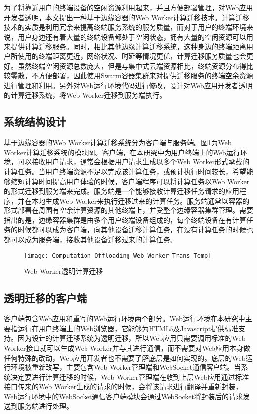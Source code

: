 为了将靠近用户的终端设备的空闲资源利用起来，并且方便部署管理，对Web应用开发者透明，本文提出一种基于边缘容器的Web Worker计算迁移技术。计算迁移技术的实质是利用冗余来提高终端服务系统的服务质量，而对于用户的终端环境来说，用户身边还有着大量的终端设备都处于空闲状态，拥有大量的空闲资源可以用来提供计算迁移服务。同时，相比其他边缘计算迁移系统，这种身边的终端距离用户所使用的终端距离更近，网络状况、时延等情况更优，计算迁移服务质量也会更好。虽然终端空闲资源总数庞大，但是与集中式云端资源相比，终端资源分布得比较零散，不方便部署，因此使用Swarm容器集群来对提供迁移服务的终端空余资源进行管理和利用。另外对Web运行环境代码进行修改，设计对Web应用开发者透明的计算迁移系统，将Web Worker迁移到服务端执行。
\subsection{系统结构设计}

基于边缘容器的Web Worker计算迁移系统分为客户端与服务端。图\ref{fig:computation_offloading_web_worker_trans}为Web Worker计算迁移系统的模块图。客户端，在本研究中为用户终端上的Web运行环境，可以接收用户请求，通常会根据用户请求生成以多个Web Worker形式承载的计算任务。当用户终端资源不足以完成该计算任务，或预计执行时间较长，希望能够缩短计算时间提高用户体验的时候，客户端程序可以将计算任务以Web Worker的形式迁移到服务端来完成。服务端是一个能够接收计算迁移任务请求的应用程序，并在本地生成Web Worker来执行迁移过来的计算任务。服务端通常以容器的形式部署在周围有空余计算资源的其他终端上，并受整个边缘容器集群管理。需要指出的是，边缘容器集群是由多个用户终端设备组成的，每个终端设备在有计算任务的时候都可以成为客户端，向其他设备迁移计算任务，在没有计算任务的时候也都可以成为服务端，接收其他设备迁移过来的计算任务。
\begin{figure}[!htbp]
    \centering
    \texttt{[image: Computation\_Offloading\_Web\_Worker\_Trans\_Temp]}
    \caption{Web Worker透明计算迁移}
    \label{fig:computation_offloading_web_worker_trans}
\end{figure}

\subsection{透明迁移的客户端}

客户端包含Web应用和重写的Web运行环境两个部分。Web运行环境在本研究中主要指运行在用户终端上的Web浏览器，它能够为HTML5及Javascript提供标准支持。因为设计的计算迁移系统为透明迁移，所以Web应用只需要调用标准的Web Worker接口就可以生成Web Worker并与其进行通信，而不需要对Web应用本身做任何特殊的改动，Web应用开发者也不需要了解底层是如何实现的。底层的Web运行环境被重新改写，主要包含Web Worker管理端和WebSocket通信客户端。当系统决定要进行计算迁移的时候，Web Worker管理端在收到上层Web应用通过标准接口传来的Web Worker生成的请求的时候，会将该请求进行翻译并重新封装，Web运行环境中的WebSocket通信客户端模块会通过WebSocket将封装后的请求发送到服务端进行处理。

